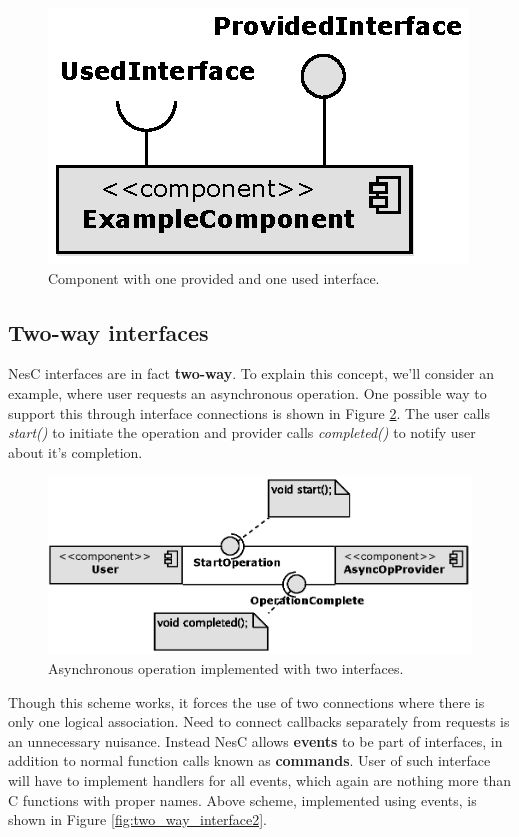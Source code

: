 \begin{figure}[h]
  \centering
  \includegraphics{diagrams/example_component.eps}
  \caption{Component with one provided and one used interface.}
  \label{fig:example_component}
\end{figure}

\subsection{Two-way interfaces}

NesC interfaces are in fact {\bf two-way}. To explain this concept,
we'll consider an example, where user requests an asynchronous
operation. One possible way to support this through interface
connections is shown in Figure \ref{fig:two_way_interface1}. The user
calls \emph{start()} to initiate the operation and provider calls
\emph{completed()} to notify user about it's completion.

\begin{figure}[h]
  \centering
  \includegraphics{diagrams/two_way_interface1.eps}
  \caption{Asynchronous operation implemented with two interfaces.}
  \label{fig:two_way_interface1}
\end{figure}

Though this scheme works, it forces the use of two connections where
there is only one logical association. Need to connect callbacks
separately from requests is an unnecessary nuisance. Instead NesC allows
{\bf events} to be part of interfaces, in addition to normal function
calls known as {\bf commands}. User of such interface will have to
implement handlers for all events, which again are nothing more than C
functions with proper names. Above scheme, implemented using events,
is shown in Figure \ref{fig:two_way_interface2}.

